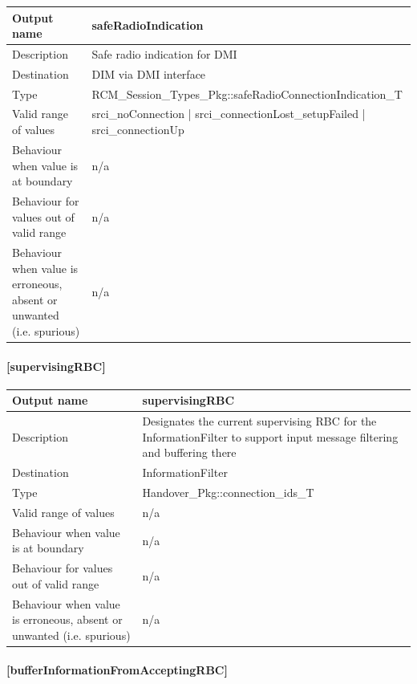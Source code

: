 \begin{longtable}{p{}p{}}
	\toprule
	Output name				& safeRadioIndication \\
	\midrule
	Description				& Safe radio indication for DMI  \\
	\midrule
	Destination				& DIM via DMI interface \\ 
	\midrule
	Type					& RCM\_Session\_Types\_Pkg::safeRadioConnectionIndication\_T \\
	\midrule
	Valid range of values	& srci\_noConnection | srci\_connectionLost\_setupFailed | srci\_connectionUp \\
	\midrule
	Behaviour when value is at boundary	& n/a \\
	\midrule
	Behaviour for values out of valid range	& n/a \\
	\midrule
	Behaviour when value is erroneous, absent or unwanted (i.e. spurious) & n/a \\
	\bottomrule
\end{longtable}

\paragraph{[supervisingRBC]}

\begin{longtable}{p{}p{}}
	\toprule
	Output name				& supervisingRBC \\
	\midrule
	Description				& Designates the current supervising RBC for the InformationFilter to support input message filtering and buffering there \\
	\midrule
	Destination				& InformationFilter \\ 
	\midrule
	Type					& Handover\_Pkg::connection\_ids\_T \\
	\midrule
	Valid range of values	& n/a \\
	\midrule
	Behaviour when value is at boundary	& n/a \\
	\midrule
	Behaviour for values out of valid range	& n/a \\
	\midrule
	Behaviour when value is erroneous, absent or unwanted (i.e. spurious) & n/a \\
	\bottomrule
\end{longtable}

\paragraph{[bufferInformationFromAcceptingRBC]}

